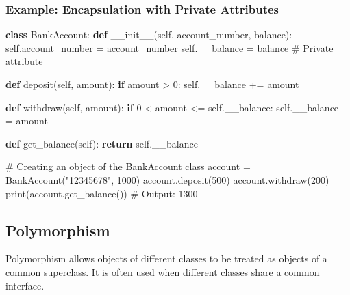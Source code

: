 \documentclass[
  letterpaper,
  DIV=11,
  numbers=noendperiod]{scrreprt}
\newenvironment{Shaded}{\begin{snugshade}}{\end{snugshade}}
\newcommand{\BuiltInTok}[1]{\textcolor[rgb]{0.00,0.23,0.31}{#1}}
\newcommand{\CommentTok}[1]{\textcolor[rgb]{0.37,0.37,0.37}{#1}}
\newcommand{\ControlFlowTok}[1]{\textcolor[rgb]{0.00,0.23,0.31}{\textbf{#1}}}
\newcommand{\DecValTok}[1]{\textcolor[rgb]{0.68,0.00,0.00}{#1}}
\newcommand{\FunctionTok}[1]{\textcolor[rgb]{0.28,0.35,0.67}{#1}}
\newcommand{\KeywordTok}[1]{\textcolor[rgb]{0.00,0.23,0.31}{\textbf{#1}}}
\newcommand{\NormalTok}[1]{\textcolor[rgb]{0.00,0.23,0.31}{#1}}
\newcommand{\OperatorTok}[1]{\textcolor[rgb]{0.37,0.37,0.37}{#1}}
\newcommand{\StringTok}[1]{\textcolor[rgb]{0.13,0.47,0.30}{#1}}
\newcommand{\VariableTok}[1]{\textcolor[rgb]{0.07,0.07,0.07}{#1}}
\begin{document}
\subsubsection{Example: Encapsulation with Private
Attributes}\label{example-encapsulation-with-private-attributes}

\begin{Shaded}
\begin{Highlighting}[]
\KeywordTok{class}\NormalTok{ BankAccount:}
    \KeywordTok{def} \FunctionTok{\_\_init\_\_}\NormalTok{(}\VariableTok{self}\NormalTok{, account\_number, balance):}
        \VariableTok{self}\NormalTok{.account\_number }\OperatorTok{=}\NormalTok{ account\_number}
        \VariableTok{self}\NormalTok{.\_\_balance }\OperatorTok{=}\NormalTok{ balance  }\CommentTok{\# Private attribute}
    
    \KeywordTok{def}\NormalTok{ deposit(}\VariableTok{self}\NormalTok{, amount):}
        \ControlFlowTok{if}\NormalTok{ amount }\OperatorTok{\textgreater{}} \DecValTok{0}\NormalTok{:}
            \VariableTok{self}\NormalTok{.\_\_balance }\OperatorTok{+=}\NormalTok{ amount}
    
    \KeywordTok{def}\NormalTok{ withdraw(}\VariableTok{self}\NormalTok{, amount):}
        \ControlFlowTok{if} \DecValTok{0} \OperatorTok{\textless{}}\NormalTok{ amount }\OperatorTok{\textless{}=} \VariableTok{self}\NormalTok{.\_\_balance:}
            \VariableTok{self}\NormalTok{.\_\_balance }\OperatorTok{{-}=}\NormalTok{ amount}
    
    \KeywordTok{def}\NormalTok{ get\_balance(}\VariableTok{self}\NormalTok{):}
        \ControlFlowTok{return} \VariableTok{self}\NormalTok{.\_\_balance}

\CommentTok{\# Creating an object of the BankAccount class}
\NormalTok{account }\OperatorTok{=}\NormalTok{ BankAccount(}\StringTok{"12345678"}\NormalTok{, }\DecValTok{1000}\NormalTok{)}
\NormalTok{account.deposit(}\DecValTok{500}\NormalTok{)}
\NormalTok{account.withdraw(}\DecValTok{200}\NormalTok{)}
\BuiltInTok{print}\NormalTok{(account.get\_balance())  }\CommentTok{\# Output: 1300}
\end{Highlighting}
\end{Shaded}

\subsection{Polymorphism}\label{polymorphism}

Polymorphism allows objects of different classes to be treated as
objects of a common superclass. It is often used when different classes
share a common interface.
\end{document}
